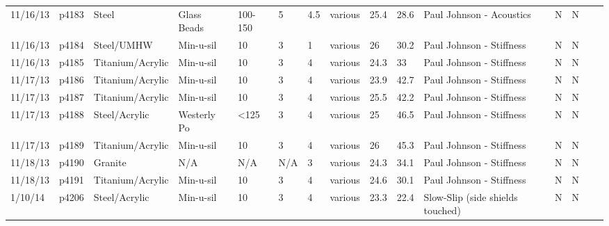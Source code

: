 \begin{landscape}
\begin{longtable}{lllllllllllllll}
11/16/13 & p4183      & Steel            & Glass Beads  & 100-150      & 5         & 4.5           & various                      & 25.4        & 28.6     & Paul Johnson - Acoustics                        & N     & N    &  &  \\
11/16/13 & p4184      & Steel/UMHW       & Min-u-sil    & 10           & 3         & 1             & various                      & 26          & 30.2     & Paul Johnson - Stiffness                        & N     & N    &  &  \\
11/16/13 & p4185      & Titanium/Acrylic & Min-u-sil    & 10           & 3         & 4             & various                      & 24.3        & 33       & Paul Johnson - Stiffness                        & N     & N    &  &  \\
11/17/13 & p4186      & Titanium/Acrylic & Min-u-sil    & 10           & 3         & 4             & various                      & 23.9        & 42.7     & Paul Johnson - Stiffness                        & N     & N    &  &  \\
11/17/13 & p4187      & Titanium/Acrylic & Min-u-sil    & 10           & 3         & 4             & various                      & 25.5        & 42.2     & Paul Johnson - Stiffness                        & N     & N    &  &  \\
11/17/13 & p4188      & Steel/Acrylic    & Westerly Po  & \textless125 & 3         & 4             & various                      & 25          & 46.5     & Paul Johnson - Stiffness                        & N     & N    &  &  \\
11/17/13 & p4189      & Titanium/Acrylic & Min-u-sil    & 10           & 3         & 4             & various                      & 26          & 45.3     & Paul Johnson - Stiffness                        & N     & N    &  &  \\
11/18/13 & p4190      & Granite          & N/A          & N/A          & N/A       & 3             & various                      & 24.3        & 34.1     & Paul Johnson - Stiffness                        & N     & N    &  &  \\
11/18/13 & p4191      & Titanium/Acrylic & Min-u-sil    & 10           & 3         & 4             & various                      & 24.6        & 30.1     & Paul Johnson - Stiffness                        & N     & N    &  &  \\
1/10/14  & p4206      & Steel/Acrylic    & Min-u-sil    & 10           & 3         & 4             & various                      & 23.3        & 22.4     & Slow-Slip (side shields touched)                & N     & N    &  &  \\

\end{longtable}
\end{landscape}
